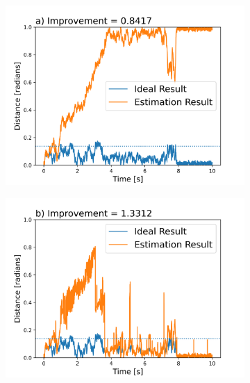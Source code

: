 \documentclass[final, 3p]{elsarticle}
\begin{document}
\begin{figure}[h]
	\centering
	\begin{subfigure}{0.32\textwidth}
		\includegraphics[width=\textwidth]{./Images/epsilon_5.png}
	\end{subfigure}
	\begin{subfigure}{0.32\textwidth}
		\includegraphics[width=\textwidth]{./Images/epsilon_15.png}
	\end{subfigure}
	\begin{subfigure}{0.32\textwidth}

\end{subfigure}
\end{figure}
\end{document}

